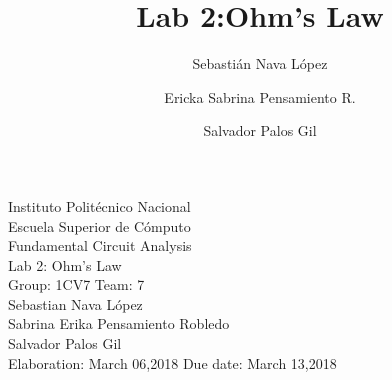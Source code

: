 \documentclass[a4paper]{article}
\title{Lab 2:Ohm's Law}
\author{
    Sebastián Nava López\\
    \and
    Ericka Sabrina Pensamiento R.\\
    \and
    Salvador Palos Gil
}
\begin{document}
\begin{titlepage}
    \centering
    {\Huge Instituto Politécnico Nacional}\\[3ex]
    {\huge Escuela Superior de Cómputo}\\[8ex]
    {\huge Fundamental Circuit Analysis}\\[12ex]
    {\Large Lab 2: Ohm's Law}\\[20ex]
    {\Large Group: 1CV7 Team: 7 \\[8ex]
    Sebastian Nava López\\[4ex]
    Sabrina Erika Pensamiento Robledo\\[4ex]
    Salvador Palos Gil\\[18ex]
    }
    \large{Elaboration: March 06,2018\hspace{8em} Due date: March 13,2018}
\end{titlepage}
\tableofcontents
\newpage
\end{document}
